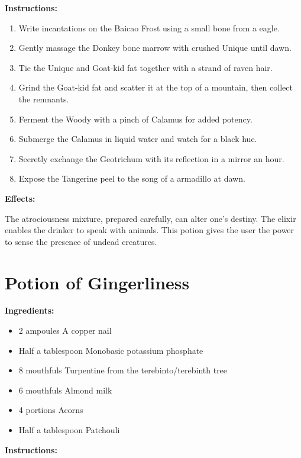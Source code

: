 \documentclass{article}
\begin{document}
\textbf{Instructions:}

\begin{enumerate}
  \item Write incantations on the Baicao Frost using a small bone from a eagle.
  \item Gently massage the Donkey bone marrow with crushed Unique until dawn.
  \item Tie the Unique and Goat-kid fat together with a strand of raven hair.
  \item Grind the Goat-kid fat and scatter it at the top of a mountain, then collect the remnants.
  \item Ferment the Woody with a pinch of Calamus for added potency.
  \item Submerge the Calamus in liquid water and watch for a black hue.
  \item Secretly exchange the Geotrichum with its reflection in a mirror an hour.
  \item Expose the Tangerine peel to the song of a armadillo at dawn.
\end{enumerate}

\textbf{Effects:}

The atrociousness mixture, prepared carefully, can alter one's destiny. The elixir enables the drinker to speak with animals. This potion gives the user the power to sense the presence of undead creatures.

\newpage
\section*{Potion of Gingerliness}

\textbf{Ingredients:}

\begin{itemize}
  \item 2 ampoules A copper nail
  \item Half a tablespoon Monobasic potassium phosphate
  \item 8 mouthfuls Turpentine from the terebinto/terebinth tree
  \item 6 mouthfuls Almond milk
  \item 4 portions Acorns
  \item Half a tablespoon Patchouli
\end{itemize}

\textbf{Instructions:}
\end{document}
